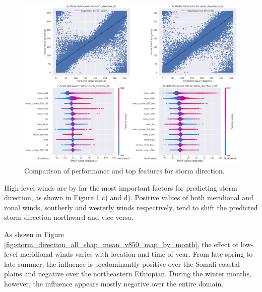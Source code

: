 \begin{figure}[ht]
    \centering
    \includegraphics[width=\textwidth]{../figures/generated/experiments/storm_direction/storm_direction_summary.png}
    \caption{Comparison of performance and top features for storm direction.}
    \label{fig:storm_direction_summary}
\end{figure}

High-level winds are by far the most important factors for predicting storm direction, as shown in Figure \ref{fig:storm_direction_summary} c) and d). Positive values of both meridional and zonal winds, southerly and westerly winds respectively, tend to shift the predicted storm direction northward and vice versa.

As shown in Figure \ref{fig:storm_direction_all_shap_mean_v850_map_by_month}, the effect of low-level meridional winds varies with location and time of year. From late spring to late summer, the influence is predominantly positive over the Somali coastal plains and negative over the northeastern Ethiopian. During the winter months, however, the influence appears mostly negative over the entire domain.

